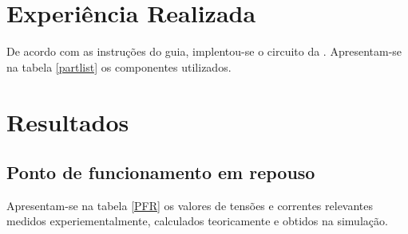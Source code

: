 \documentclass[%
  reprint,
  nofootinbib,
  amsmath,amssymb,
  aps,
  10pt,
  a4paper
]{revtex4-1}
\begin{document}
\section{Experiência Realizada}
\label{s:expreal}
De acordo com as instruções do guia, implentou-se o circuito da . Apresentam-se na tabela \ref{partlist} os componentes utilizados.




\section{Resultados}
\label{s:resul}


\subsection{Ponto de funcionamento em repouso}
Apresentam-se na tabela \ref{PFR} os valores de tensões e correntes relevantes medidos experiementalmente, calculados teoricamente e obtidos na simulação.
\end{document}
